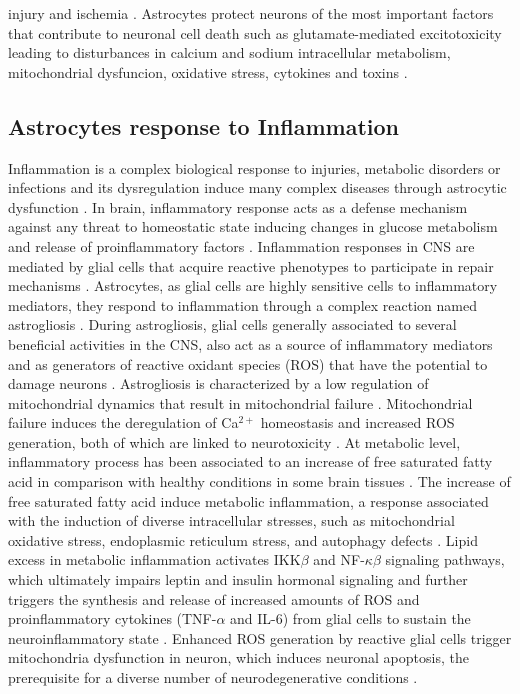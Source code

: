 injury and ischemia \cite{Avila-Rodriguez2014,Jha2016}. Astrocytes protect neurons of the most important factors that contribute to neuronal cell death such as glutamate-mediated excitotoxicity leading to disturbances in calcium and sodium intracellular metabolism, mitochondrial dysfuncion, oxidative stress, cytokines and toxins \cite{Takuma2004,Lange2012,Nijboer2013,Hussain2013}.

\subsection*{Astrocytes response to Inflammation}
Inflammation is a complex biological response to injuries, metabolic disorders or infections and its dysregulation induce many complex diseases through astrocytic dysfunction \cite{Masel2010,Yan2013,Jha2016}. In brain, inflammatory response acts as a defense mechanism against any threat to homeostatic state inducing changes in glucose metabolism and release of proinflammatory factors \cite{Allaman2011}. Inflammation responses in CNS are mediated by glial cells that acquire reactive phenotypes to participate in repair mechanisms \cite{Takuma2004,Fitch2008,Jha2016}. Astrocytes, as glial cells are highly sensitive cells to inflammatory mediators, they respond to inflammation through a complex reaction named astrogliosis \cite{Dowell2009a}. During astrogliosis, glial cells generally associated to several beneficial activities in the CNS, also act as a source of inflammatory mediators and as generators of reactive oxidant species (ROS) that have the potential to damage neurons \cite{Molofsk2012}. Astrogliosis is characterized by a low regulation of mitochondrial dynamics that result in mitochondrial failure \cite{Sidoryk-Wegrzynowicz2013}.  Mitochondrial failure induces the deregulation of Ca$^{2+}$ homeostasis and increased ROS generation, both of which are linked to neurotoxicity \cite{Lange2012}. At metabolic level, inflammatory process has been associated to an increase of free saturated fatty acid in comparison with healthy conditions in some brain tissues \cite{Gupta2012}. The increase of free saturated fatty acid induce metabolic inflammation, a response associated with the induction of diverse intracellular stresses, such as mitochondrial oxidative stress, endoplasmic reticulum stress, and autophagy defects \cite{Jha2016}. Lipid excess in metabolic inflammation activates IKK$\beta$ and NF-$\kappa\beta$ signaling pathways, which ultimately impairs leptin and insulin hormonal signaling and further triggers the synthesis and release of increased amounts of ROS and proinflammatory cytokines (TNF-$\alpha$ and IL-6) from glial cells to sustain the neuroinflammatory state \cite{Purkayastha2015}. Enhanced ROS generation by reactive glial cells trigger mitochondria dysfunction in neuron, which induces neuronal apoptosis, the prerequisite for a diverse number of neurodegenerative conditions \cite{K.2006}.

